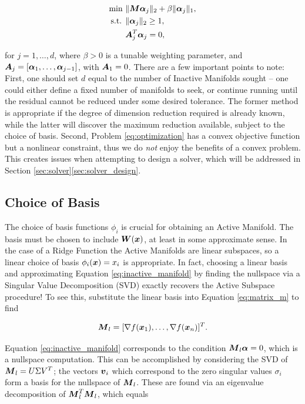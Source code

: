 \documentclass[]{aiaa-tc}%
\begin{document}
\begin{equation}
\begin{aligned}
\label{eq:optimization}
\text{min  }& \|\boldsymbol{M}\boldsymbol{\alpha}_j\|_2 + \beta\|\boldsymbol{\alpha}_j\|_1, \\
\text{s.t. }& \|\boldsymbol{\alpha}_j\|_2\geq1, \\
            & \boldsymbol{A}_j^T \boldsymbol{\alpha}_j = 0,
\end{aligned}
\end{equation}

for $j=1,\dots,d$, where $\beta>0$ is a tunable weighting parameter, and $\boldsymbol{A}_j=[\boldsymbol{\alpha}_1,\dots,\boldsymbol{\alpha}_{j-1}]$, with $\boldsymbol{A}_1=0$. There are a few important points to note: First, one should set $d$ equal to the number of Inactive Manifolds sought -- one could either define a fixed number of manifolds to seek, or continue running until the residual cannot be reduced under some desired tolerance. The former method is appropriate if the degree of dimension reduction required is already known, while the latter will discover the maximum reduction available, subject to the choice of basis. Second, Problem \ref{eq:optimization} has a convex objective function but a nonlinear constraint, thus we do \emph{not} enjoy the benefits of a convex problem. This creates issues when attempting to design a solver, which will be addressed in Section \ref{sec:solver}\ref{sec:solver_design}.

\subsection{Choice of Basis} \label{sec:basis}
The choice of basis functions $\phi_i$ is crucial for obtaining an Active Manifold. The basis must be chosen to include $\boldsymbol{W}(\boldsymbol{x})$, at least in some approximate sense. In the case of a Ridge Function the Active Manifolds are linear subspaces, so a linear choice of basis $\phi_i(\boldsymbol{x}) = x_i$ is appropriate. In fact, choosing a linear basis and approximating Equation \ref{eq:inactive_manifold} by finding the nullspace via a Singular Value Decomposition (SVD) exactly recovers the Active Subspace procedure! To see this, substitute the linear basis into Equation \ref{eq:matrix_m} to find

\begin{equation}
\label{eq:matrix_m_linear}
\boldsymbol{M}_l = [\nabla f(\boldsymbol{x}_1),\dots,\nabla f(\boldsymbol{x}_n)]^T.
\end{equation}

Equation \ref{eq:inactive_manifold} corresponds to the condition $\boldsymbol{M}_l\boldsymbol{\alpha}=0$, which is a nullspace computation. This can be accomplished by considering the SVD of $\boldsymbol{M}_l=U\Sigma V^T$; the vectors $\boldsymbol{v}_i$ which correspond to the zero singular values $\sigma_i$ form a basis for the nullspace of $\boldsymbol{M}_l$. These are found via an eigenvalue decomposition of $\boldsymbol{M}_l^T\boldsymbol{M}_l$, which equals
\end{document}
